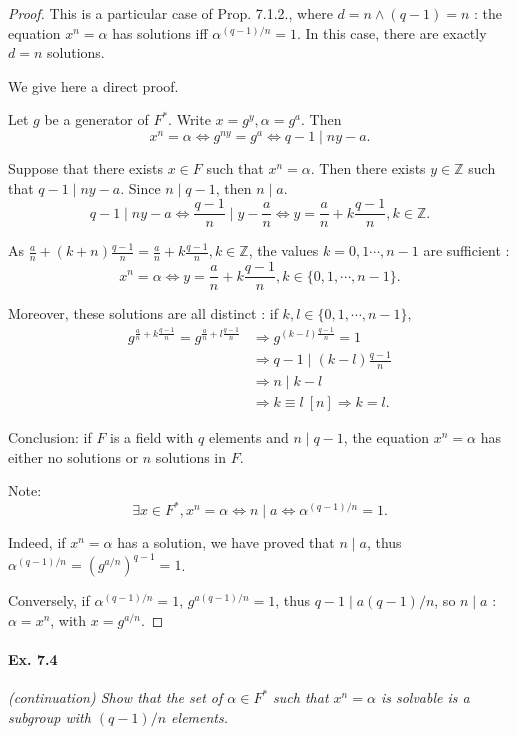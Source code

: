 \documentclass[11pt,a4paper]{article}
\newcommand{\Z}{\mathbb{Z}}
\begin{document}
\begin{proof} This is a particular case of Prop. 7.1.2., where $d = n \wedge (q-1) = n$ : the equation $x^n =\alpha$ has solutions iff $\alpha^{(q-1)/n} = 1$. In this case, there are exactly $d = n$ solutions.

We give  here a direct proof.

Let $g$ be a generator of $F^*$.  Write $x = g^y, \alpha = g^a$. Then
$$x^n = \alpha \iff g^{ny} = g^a\iff q-1 \mid ny -a.$$

Suppose that there exists $x\in F$ such that $x^n = \alpha$. Then there exists $y\in \Z$ such that $q-1 \mid ny -a$. Since $n \mid q-1$, then  $n \mid a$.
$$q-1 \mid ny -a \iff \frac{q-1}{n} \mid y - \frac{a}{n}\iff y= \frac{a}{n} + k \frac{q-1}{n}, k\in \mathbb{Z}.$$

As  $\frac{a}{n} + (k+n) \frac{q-1}{n} = \frac{a}{n} + k \frac{q-1}{n}, k\in \mathbb{Z}$, the values $k=0,1\cdots,n-1 $ are sufficient :
$$x^n=\alpha \iff y = \frac{a}{n} + k \frac{q-1}{n}, k\in \{0,1,\cdots,n-1\}.$$

Moreover, these solutions are all distinct : if $k,l\in  \{0,1,\cdots,n-1\}$,
\begin{align*}
g^{\frac{a}{n} + k \frac{q-1}{n}} = g^{\frac{a}{n} + l \frac{q-1}{n}} & \Rightarrow g^{(k-l) \frac{q-1}{n}} = 1\\
&\Rightarrow q-1 \mid (k-l) \frac{q-1}{n}\\
& \Rightarrow n \mid k-l \\
&\Rightarrow k\equiv l \ [n] \Rightarrow k=l.
\end{align*}

Conclusion: if  $F$ is a field with $q$ elements and $n \mid q-1$, the equation $x^n = \alpha$ has either no solutions or $n$ solutions in $F$.

Note: $$\exists x \in F^*, x^n = \alpha \iff n \mid a \iff \alpha^{(q-1)/n} = 1.$$

Indeed, if $x^n = \alpha$ has a solution, we have proved that $n\mid a$, thus $\alpha^{(q-1)/n} = (g^{a/n})^{q-1} = 1$.

Conversely, if $\alpha^{(q-1)/n} = 1$, $g^{a(q-1)/ n }=1$, thus $q-1 \mid a(q-1)/n$, so $ n \mid a$ :  $\alpha = x^n$, with $x = g^{a/n}$.
\end{proof}

\paragraph{Ex. 7.4}

{\it (continuation) Show that the set of $\alpha \in F^*$ such that $x^n = \alpha$ is solvable is a subgroup with $(q-1)/n$ elements.
}
\end{document}

